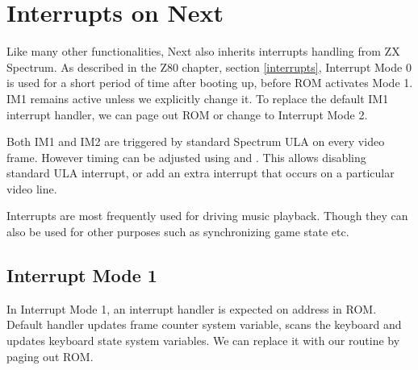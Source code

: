 \section{Interrupts on Next}
\label{zx_next_interrupts}


Like many other functionalities, Next also inherits interrupts handling from ZX Spectrum. As described in the Z80 chapter, section \ref{interrupts}, Interrupt Mode 0 is used for a short period of time after booting up, before ROM activates Mode 1. IM1 remains active unless we explicitly change it. To replace the default IM1 interrupt handler, we can page out ROM or change to Interrupt Mode 2.

Both IM1 and IM2 are triggered by standard Spectrum ULA on every video frame. However timing can be adjusted using  and . This allows disabling standard ULA interrupt, or add an extra interrupt that occurs on a particular video line.

Interrupts are most frequently used for driving music playback. Though they can also be used for other purposes such as synchronizing game state etc.


\subsection{Interrupt Mode 1}

In Interrupt Mode 1, an interrupt handler is expected on address  in ROM. Default handler updates frame counter system variable, scans the keyboard and updates keyboard state system variables. We can replace it with our routine by paging out ROM.

